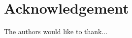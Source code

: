 \documentclass[conference]{IEEEtran}
\begin{document}
\section*{Acknowledgement}

The authors would like to thank...




\end{document}
